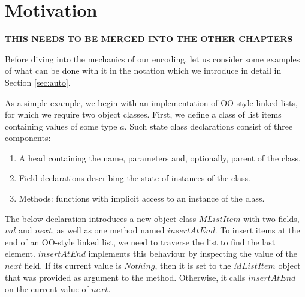 \section{Motivation}
\label{sec:usage}

\textbf{THIS NEEDS TO BE MERGED INTO THE OTHER CHAPTERS}

Before diving into the mechanics of our encoding, let us consider some examples of what can be done with it in the notation which we introduce in detail in Section \ref{sec:auto}. %

As a simple example, we begin with an implementation of OO-style linked lists, for which we require two object classes. First, we define a class of list items containing values of some type $a$. Such state class declarations consist of three components: 
\begin{enumerate}
    \item A head containing the name, parameters and, optionally, parent of the class.
    \item Field declarations describing the state of instances of the class.
    \item Methods: functions with implicit access to an instance of the class.
\end{enumerate}
The below declaration introduces a new object class $\mathit{MListItem}$ with two fields, $\mathit{val}$ and $\mathit{next}$, as well as one method named $\mathit{insertAtEnd}$. To insert items at the end of an OO-style linked list, we need to traverse the list to find the last element.  $\mathit{insertAtEnd}$ implements this behaviour by inspecting the value of the $\mathit{next}$ field. If its current value is $\mathit{Nothing}$, then it is set to the $\mathit{MListItem}$ object that was provided as argument to the method. Otherwise, it calls $\mathit{insertAtEnd}$ on the current value of $\mathit{next}$.
